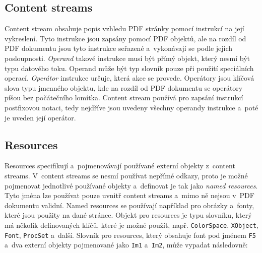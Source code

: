 \subsection*{Content streams} \label{content_streams}
Content stream obsahuje popis vzhledu PDF stránky pomocí instrukcí na její
vykreslení. Tyto instrukce jsou zapsány pomocí PDF objektů, ale na rozdíl od
PDF dokumentu jsou tyto instrukce seřazené a~vykonávají se podle jejich
posloupnosti. \emph{Operand} takové instrukce musí být přímý objekt, který 
nesmí být typu datového toku. Operand může být typ slovník pouze při použití
speciálních operací. \emph{Operátor} instrukce určuje, která akce se provede.
Operátory jsou klíčová slova typu jmenného objektu, kde na rozdíl od PDF dokumentu
se operátory píšou bez počátečního lomítka. Content stream používá pro zapsání
instrukcí postfixovou notaci, tedy nejdříve jsou uvedeny všechny operandy instrukce
a~poté je uveden její operátor.


\subsection*{Resources} \label{resources}
Resources specifikují a~pojmenovávají používané externí objekty z~content streams.
V~content streams se nesmí používat nepřímé odkazy, proto je možné pojmenovat
jednotlivé používané objekty a~definovat je tak jako \emph{named resources}.
Tyto jména lze používat pouze uvnitř content streams a~mimo ně nejsou v~PDF
dokumentu validní. Named resources se používají například pro obrázky a~fonty,
které jsou použity na dané stránce. Objekt pro resources je typu slovníku, který
má několik definovaných klíčů, které je možné použít, např. \texttt{ColorSpace}, 
\texttt{XObject}, \texttt{Font}, \texttt{ProcSet} a~další. Slovník pro resources,
který obsahuje font pod jménem \texttt{F5} a~dva externí objekty pojmenované jako
\texttt{Im1} a~\texttt{Im2}, může vypadat následovně:




